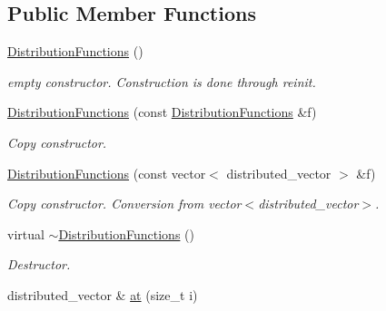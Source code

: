 \subsection*{Public Member Functions}
\begin{DoxyCompactItemize}
\item 
\hypertarget{classnatrium_1_1DistributionFunctions_a4fc9c42637465355a9df7681d45340c9}{\hyperlink{classnatrium_1_1DistributionFunctions_a4fc9c42637465355a9df7681d45340c9}{Distribution\-Functions} ()}\label{classnatrium_1_1DistributionFunctions_a4fc9c42637465355a9df7681d45340c9}

\begin{DoxyCompactList}\small\item\em empty constructor. Construction is done through reinit. \end{DoxyCompactList}\item 
\hypertarget{classnatrium_1_1DistributionFunctions_af0a970355419acf79be898e573f3149a}{\hyperlink{classnatrium_1_1DistributionFunctions_af0a970355419acf79be898e573f3149a}{Distribution\-Functions} (const \hyperlink{classnatrium_1_1DistributionFunctions}{Distribution\-Functions} \&f)}\label{classnatrium_1_1DistributionFunctions_af0a970355419acf79be898e573f3149a}

\begin{DoxyCompactList}\small\item\em Copy constructor. \end{DoxyCompactList}\item 
\hypertarget{classnatrium_1_1DistributionFunctions_a0ea3ad0426df18a986578f7b57361dd3}{\hyperlink{classnatrium_1_1DistributionFunctions_a0ea3ad0426df18a986578f7b57361dd3}{Distribution\-Functions} (const vector$<$ distributed\-\_\-vector $>$ \&f)}\label{classnatrium_1_1DistributionFunctions_a0ea3ad0426df18a986578f7b57361dd3}

\begin{DoxyCompactList}\small\item\em Copy constructor. Conversion from vector$<$distributed\-\_\-vector$>$. \end{DoxyCompactList}\item 
\hypertarget{classnatrium_1_1DistributionFunctions_af965a46fbf124e8f90250c843e615bcd}{virtual \hyperlink{classnatrium_1_1DistributionFunctions_af965a46fbf124e8f90250c843e615bcd}{$\sim$\-Distribution\-Functions} ()}\label{classnatrium_1_1DistributionFunctions_af965a46fbf124e8f90250c843e615bcd}

\begin{DoxyCompactList}\small\item\em Destructor. \end{DoxyCompactList}\item 
\hypertarget{classnatrium_1_1DistributionFunctions_a34f0147178c17597eaf24befdcced975}{distributed\-\_\-vector \& \hyperlink{classnatrium_1_1DistributionFunctions_a34f0147178c17597eaf24befdcced975}{at} (size\-\_\-t i)}\label{classnatrium_1_1DistributionFunctions_a34f0147178c17597eaf24befdcced975}


\end{DoxyCompactItemize}
